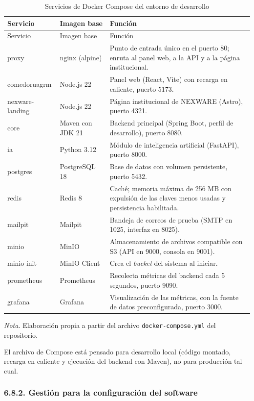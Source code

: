 \begin{longtable}{>{\raggedright\arraybackslash}p{3.0cm} >{\raggedright\arraybackslash}p{3.4cm} >{\raggedright\arraybackslash}p{6.4cm}}
\caption{Servicios de Docker Compose del entorno de desarrollo}\label{tab:servicios_compose}\\
\toprule
Servicio & Imagen base & Función \\
\midrule
\endfirsthead
\toprule
Servicio & Imagen base & Función \\
\midrule
\endhead
\bottomrule
\endfoot
proxy & nginx (alpine) & Punto de entrada único en el puerto 80; enruta al panel web, a la API y a la página institucional. \\
comedoruagrm & Node.js 22 & Panel web (React, Vite) con recarga en caliente, puerto 5173. \\
nexware-landing & Node.js 22 & Página institucional de NEXWARE (Astro), puerto 4321. \\
core & Maven con JDK 21 & Backend principal (Spring Boot, perfil de desarrollo), puerto 8080. \\
ia & Python 3.12 & Módulo de inteligencia artificial (FastAPI), puerto 8000. \\
postgres & PostgreSQL 18 & Base de datos con volumen persistente, puerto 5432. \\
redis & Redis 8 & Caché; memoria máxima de 256 MB con expulsión de las claves menos usadas y persistencia habilitada. \\
mailpit & Mailpit & Bandeja de correos de prueba (SMTP en 1025, interfaz en 8025). \\
minio & MinIO & Almacenamiento de archivos compatible con S3 (API en 9000, consola en 9001). \\
minio-init & MinIO Client & Crea el \textit{bucket} del sistema al iniciar. \\
prometheus & Prometheus & Recolecta métricas del backend cada 5 segundos, puerto 9090. \\
grafana & Grafana & Visualización de las métricas, con la fuente de datos preconfigurada, puerto 3000. \\
\end{longtable}
\noindent\textit{Nota.} Elaboración propia a partir del archivo \texttt{docker-compose.yml} del repositorio.

El archivo de Compose está pensado para desarrollo local (código montado, recarga en caliente y ejecución del backend con Maven), no para producción tal cual.

\subsubsection{6.8.2. Gestión para la configuración del software}

